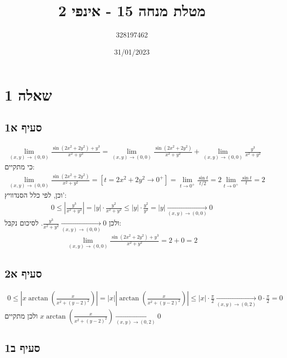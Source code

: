\documentclass{article}
\title{מטלת מנחה 15 - אינפי 2}
\author{328197462}
\date{31/01/2023}
\begin{document}
\maketitle

\section*{שאלה 1}

\subsection*{סעיף א1}

\begin{align*}
    \lim_{(x,y)\rightarrow(0,0)} \frac{\sin(2x^2+2y^2)+y^3}{x^2+y^2}=
    \lim_{(x,y)\rightarrow(0,0)}\frac{\sin(2x^2+2y^2)}{x^2+y^2}+\lim_{(x,y)\rightarrow(0,0)}\frac{y^3}{x^2+y^2}
\end{align*}
כי מתקיים:
\begin{align*}
    \lim_{(x,y)\rightarrow(0,0)}\frac{\sin(2x^2+2y^2)}{x^2+y^2}=
    [t=2x^2+2y^2\rightarrow 0^+]=
    \lim_{t\rightarrow 0^+}\frac{\sin t}{t/2}=
    2\lim_{t\rightarrow 0^+}\frac{\sin t}{t}=
    2
\end{align*}
וכן, לפי כלל הסנדוויץ':
\begin{align*}
    0\leq \left|\frac{y^3}{x^2+y^2}\right|=
    |y| \cdot \frac{y^2}{x^2+y^2} \leq
    |y| \cdot \frac{y^2}{y^2} =
    |y|\xrightarrow[(x,y)\rightarrow(0,0)]{}0
\end{align*}
ולכן $\frac{y^3}{x^2+y^2}\xrightarrow[(x,y)\rightarrow(0,0)]{}0$.
לסיכום נקבל:
\begin{align*}
    \lim_{(x,y)\rightarrow(0,0)} \frac{\sin(2x^2+2y^2)+y^3}{x^2+y^2}=2+0=2
\end{align*}

\subsection*{סעיף א2}

\begin{align*}
    0\leq \left|x\arctan \left( \frac{x}{x^2+(y-2)^2} \right)\right|=
    |x| \left|\arctan\left( \frac{x}{x^2+(y-2)^2} \right)\right|\leq
    |x|\cdot \frac{\pi}{2} \xrightarrow[(x,y)\rightarrow(0,2)]{} 0 \cdot \frac{\pi}{2}= 0
\end{align*}
ולכן מתקיים $x\arctan \left( \frac{x}{x^2+(y-2)^2} \right)\xrightarrow[(x,y)\rightarrow(0,2)]{} 0$

\subsection*{סעיף ב1}
\end{document}
